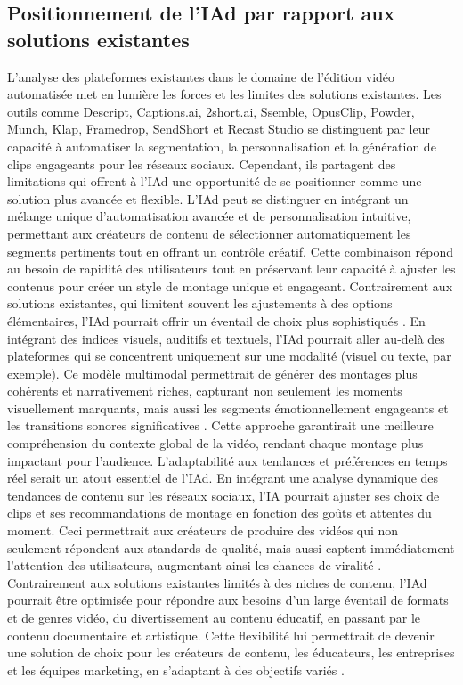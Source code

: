 \documentclass[livre]{udes-genie-these}
\begin{document}
\subsection{Positionnement de l'IAd par rapport aux solutions existantes}
L'analyse des plateformes existantes dans le domaine de l'édition vidéo automatisée met en lumière les forces et les limites des solutions existantes. Les outils comme Descript, Captions.ai, 2short.ai, Ssemble, OpusClip, Powder, Munch, Klap, Framedrop, SendShort et Recast Studio se distinguent par leur capacité à automatiser la segmentation, la personnalisation et la génération de clips engageants pour les réseaux sociaux. Cependant, ils partagent des limitations qui offrent à l'IAd une opportunité de se positionner comme une solution plus avancée et flexible.
L'IAd peut se distinguer en intégrant un mélange unique d'automatisation avancée et de personnalisation intuitive, permettant aux créateurs de contenu de sélectionner automatiquement les segments pertinents tout en offrant un contrôle créatif. Cette combinaison répond au besoin de rapidité des utilisateurs tout en préservant leur capacité à ajuster les contenus pour créer un style de montage unique et engageant. Contrairement aux solutions existantes, qui limitent souvent les ajustements à des options élémentaires, l'IAd pourrait offrir un éventail de choix plus sophistiqués \cite{descript2024, short2024, ssemble2024, klap2024}.
En intégrant des indices visuels, auditifs et textuels, l'IAd pourrait aller au-delà des plateformes qui se concentrent uniquement sur une modalité (visuel ou texte, par exemple). Ce modèle multimodal permettrait de générer des montages plus cohérents et narrativement riches, capturant non seulement les moments visuellement marquants, mais aussi les segments émotionnellement engageants et les transitions sonores significatives \cite{captions2024, powder2024, framedrop2024}. Cette approche garantirait une meilleure compréhension du contexte global de la vidéo, rendant chaque montage plus impactant pour l'audience.
L'adaptabilité aux tendances et préférences en temps réel serait un atout essentiel de l'IAd. En intégrant une analyse dynamique des tendances de contenu sur les réseaux sociaux, l'IA pourrait ajuster ses choix de clips et ses recommandations de montage en fonction des goûts et attentes du moment. Ceci permettrait aux créateurs de produire des vidéos qui non seulement répondent aux standards de qualité, mais aussi captent immédiatement l'attention des utilisateurs, augmentant ainsi les chances de viralité \cite{descript2024, opusclip2024, framedrop2024, sendshort2024}.
Contrairement aux solutions existantes limités à des niches de contenu, l'IAd pourrait être optimisée pour répondre aux besoins d'un large éventail de formats et de genres vidéo, du divertissement au contenu éducatif, en passant par le contenu documentaire et artistique. Cette flexibilité lui permettrait de devenir une solution de choix pour les créateurs de contenu, les éducateurs, les entreprises et les équipes marketing, en s'adaptant à des objectifs variés \cite{powder2024, munch2024, recast2024}.
\end{document}
